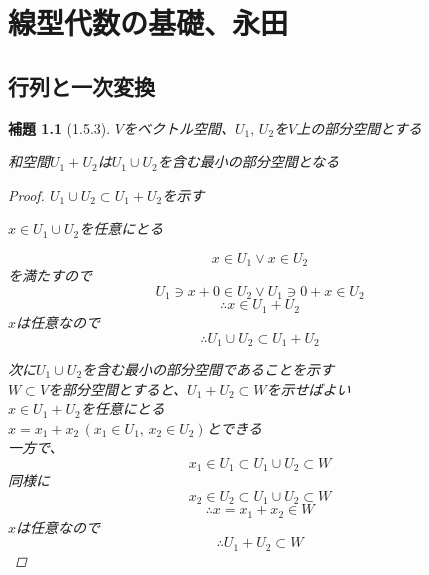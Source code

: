 \documentclass{book}
\newtheorem*{lemma}{補題}
\begin{document}
\chapter{線型代数の基礎、永田}

\section{行列と一次変換}

\begin{lemma}[1.5.3]
  $V$をベクトル空間、$U_1,\,U_2$を$V$上の部分空間とする

  和空間$U_1+U_2$は$U_1\cup U_2$を含む最小の部分空間となる

  \begin{proof}
    $U_1\cup U_2 \subset U_1+U_2$を示す

    $x\in U_1\cup U_2$を任意にとる

    \[
      x\in U_1\lor x\in U_2
    \]
    を満たすので
    \[
      U_1\ni x + 0 \in U_2\lor U_1\ni 0 + x\in U_2
    \]
    \[
      \therefore x\in U_1 + U_2
    \]
    $x$は任意なので
    \[
      \therefore U_1\cup U_2 \subset U_1+U_2
    \]

    次に$U_1\cup U_2$を含む最小の部分空間であることを示す\\
    $W \subset V$を部分空間とすると、$U_1+U_2\subset W$を示せばよい\\
    $x\in U_1+U_2$を任意にとる\\
    $x=x_1+x_2\,(x_1\in U_1,\,x_2\in U_2)$とできる\\
    一方で、
    \[
      x_1\in U_1 \subset U_1\cup U_2\subset W
    \]
    同様に
    \[
      x_2\in U_2 \subset U_1\cup U_2\subset W
    \]
    \[
      \therefore x = x_1+x_2\in W
    \]
    $x$は任意なので
    \[
      \therefore U_1+U_2\subset W
    \]
  \end{proof}
\end{lemma}
\end{document}
